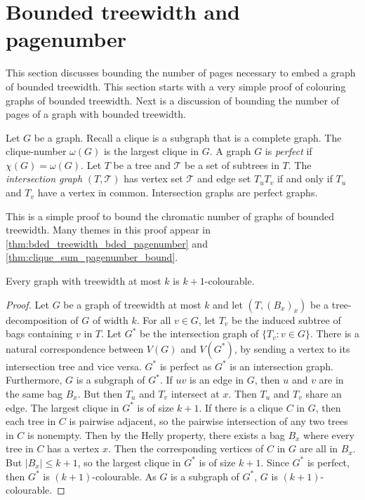 
\section{Bounded treewidth and pagenumber}\label{sec:Bounded_Treewidth}

This section discusses bounding the number of pages necessary to embed a graph of bounded treewidth. This section starts with a very simple proof of colouring graphs of bounded treewidth. Next is a discussion of bounding the number of pages of a graph with bounded treewidth.

Let $G$ be a graph. Recall a clique is a subgraph that is a complete graph. The clique-number $\omega(G)$ is the largest clique in $G$. A graph $G$ is \textit{perfect} if $\chi(G) = \omega(G)$. Let $T$ be a tree and $\mathcal{T}$ be a set of subtrees in $T$. The \textit{intersection graph} $(T, \mathcal{T})$ has vertex set $\mathcal{T}$ and edge set $T_u T_v$ if and only if $T_u$ and $T_v$ have a vertex in common. Intersection graphs are perfect graphs. 

This is a simple proof to bound the chromatic number of graphs of bounded treewidth. Many themes in this proof appear in \cref{thm:bded_treewidth_bded_pagenumber} and \cref{thm:clique_sum_pagenumber_bound}. 
\begin{theorem}
	Every graph with treewidth at most $k$ is $k + 1$-colourable.
\end{theorem}

\begin{proof}
	Let $G$ be a graph of treewidth at most $k$ and let $(T, {(B_x)}_x)$ be a tree-decomposition of $G$ of width $k$. For all $v \in G$, let $T_v$ be the induced subtree of bags containing $v$ in $T$. Let $G^*$ be the intersection graph of $\{T_v : v \in G\}$. There is a natural correspondence between $V(G)$ and $V(G^*)$, by sending a vertex to its intersection tree and vice versa. $G^*$ is perfect as $G^*$ is an intersection graph. Furthermore, $G$ is a subgraph of $G^*$. If $uv$ is an edge in $G$, then $u$ and $v$ are in the same bag $B_x$. But then $T_u$ and $T_v$ intersect at $x$. Then $T_u$ and $T_v$ share an edge. The largest clique in $G^*$ is of size $k + 1$. If there is a clique $C$ in $G$, then each tree in $C$ is pairwise adjacent, so the pairwise intersection of any two trees in $C$ is nonempty. Then by the Helly property, there exists a bag $B_x$ where every tree in $C$ has a vertex $x$. Then the corresponding vertices of $C$ in $G$ are all in $B_x$. But $|B_x| \leq k + 1$, so the largest clique in $G^*$ is of size $k + 1$. Since $G^*$ is perfect, then $G^*$ is $(k + 1)$-colourable. As $G$ is a subgraph of $G^*$, $G$ is $(k + 1)$-colourable. 
\end{proof}

